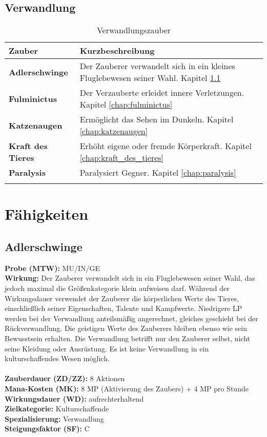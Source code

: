 \subsection{Verwandlung}
\begin{longtable}{|p{5cm}|p{10cm}|}
\hline
\textbf{Zauber} & \textbf{Kurzbeschreibung} \\ \hline

\textbf{Adlerschwinge} & Der Zauberer verwandelt sich in ein kleines Fluglebewesen seiner Wahl. Kapitel \ref{chap:adlerschwinge} \\ \hline

\textbf{Fulminictus} & Der Verzauberte erleidet innere Verletzungen. Kapitel \ref{chap:fulminictus} \\ \hline

\textbf{Katzenaugen} & Ermöglicht das Sehen im Dunkeln. Kapitel \ref{chap:katzenaugen} \\ \hline

\textbf{Kraft des Tieres} & Erhöht eigene oder fremde Körperkraft. Kapitel \ref{chap:kraft_des_tieres} \\ \hline

\textbf{Paralysis} & Paralysiert Gegner. Kapitel \ref{chap:paralysis} \\ \hline

\caption{Verwandlungszauber}
\label{tab:verwandlungszauber}
\end{longtable}



\section{Fähigkeiten}

\subsection{Adlerschwinge}
\label{chap:adlerschwinge}
\textbf{Probe (MTW):} MU/IN/GE \\
\textbf{Wirkung:} Der Zauberer verwandelt sich in ein Fluglebewesen seiner Wahl, das jedoch maximal die Größenkategorie klein aufweisen darf. Während der Wirkungsdauer verwendet der Zauberer die körperlichen Werte des Tieres, einschließlich seiner Eigenschaften, Talente und Kampfwerte. Niedrigere LP werden bei der Verwandlung anteilsmäßig angerechnet, gleiches geschieht bei der Rückverwandlung. Die geistigen Werte des Zauberers bleiben ebenso wie sein Bewusstsein erhalten. Die Verwandlung betrifft nur den Zauberer selbst, nicht seine Kleidung oder Ausrüstung. Es ist keine Verwandlung in ein kulturschaffendes Wesen möglich.\\
 \\
\textbf{Zauberdauer (ZD/ZZ):} 8 Aktionen \\
\textbf{Mana-Kosten (MK):} 8 MP (Aktivierung des Zaubers) + 4 MP pro Stunde \\
\textbf{Wirkungsdauer (WD):} aufrechterhaltend \\
\textbf{Zielkategorie:} Kulturschaffende \\
\textbf{Spezialisierung:} Verwandlung \\
\textbf{Steigungsfaktor (SF):} C


